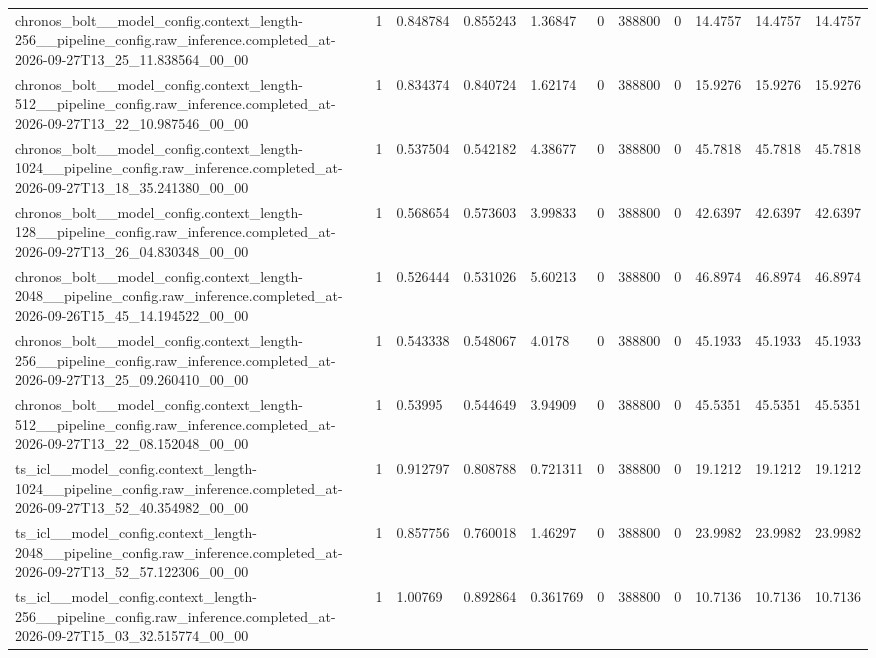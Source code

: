 \begin{tabular}{lllllllllll}
chronos\_bolt\_\_model\_config.context\_length-256\_\_pipeline\_config.raw\_inference.completed\_at-2026-09-27T13\_25\_11.838564\_00\_00 & 1 & 0.848784 & 0.855243 & 1.36847 & 0 & 388800 & 0 & 14.4757 & 14.4757 & 14.4757 \\
chronos\_bolt\_\_model\_config.context\_length-512\_\_pipeline\_config.raw\_inference.completed\_at-2026-09-27T13\_22\_10.987546\_00\_00 & 1 & 0.834374 & 0.840724 & 1.62174 & 0 & 388800 & 0 & 15.9276 & 15.9276 & 15.9276 \\
chronos\_bolt\_\_model\_config.context\_length-1024\_\_pipeline\_config.raw\_inference.completed\_at-2026-09-27T13\_18\_35.241380\_00\_00 & 1 & 0.537504 & 0.542182 & 4.38677 & 0 & 388800 & 0 & 45.7818 & 45.7818 & 45.7818 \\
chronos\_bolt\_\_model\_config.context\_length-128\_\_pipeline\_config.raw\_inference.completed\_at-2026-09-27T13\_26\_04.830348\_00\_00 & 1 & 0.568654 & 0.573603 & 3.99833 & 0 & 388800 & 0 & 42.6397 & 42.6397 & 42.6397 \\
chronos\_bolt\_\_model\_config.context\_length-2048\_\_pipeline\_config.raw\_inference.completed\_at-2026-09-26T15\_45\_14.194522\_00\_00 & 1 & 0.526444 & 0.531026 & 5.60213 & 0 & 388800 & 0 & 46.8974 & 46.8974 & 46.8974 \\
chronos\_bolt\_\_model\_config.context\_length-256\_\_pipeline\_config.raw\_inference.completed\_at-2026-09-27T13\_25\_09.260410\_00\_00 & 1 & 0.543338 & 0.548067 & 4.0178 & 0 & 388800 & 0 & 45.1933 & 45.1933 & 45.1933 \\
chronos\_bolt\_\_model\_config.context\_length-512\_\_pipeline\_config.raw\_inference.completed\_at-2026-09-27T13\_22\_08.152048\_00\_00 & 1 & 0.53995 & 0.544649 & 3.94909 & 0 & 388800 & 0 & 45.5351 & 45.5351 & 45.5351 \\
ts\_icl\_\_model\_config.context\_length-1024\_\_pipeline\_config.raw\_inference.completed\_at-2026-09-27T13\_52\_40.354982\_00\_00 & 1 & 0.912797 & 0.808788 & 0.721311 & 0 & 388800 & 0 & 19.1212 & 19.1212 & 19.1212 \\
ts\_icl\_\_model\_config.context\_length-2048\_\_pipeline\_config.raw\_inference.completed\_at-2026-09-27T13\_52\_57.122306\_00\_00 & 1 & 0.857756 & 0.760018 & 1.46297 & 0 & 388800 & 0 & 23.9982 & 23.9982 & 23.9982 \\
ts\_icl\_\_model\_config.context\_length-256\_\_pipeline\_config.raw\_inference.completed\_at-2026-09-27T15\_03\_32.515774\_00\_00 & 1 & 1.00769 & 0.892864 & 0.361769 & 0 & 388800 & 0 & 10.7136 & 10.7136 & 10.7136 \\

\end{tabular}
